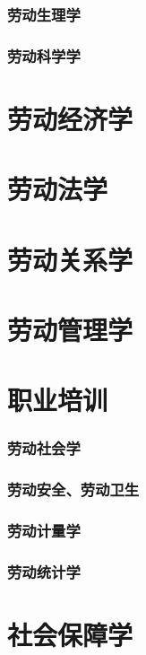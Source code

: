 \documentclass[UTF8]{../RepresentationUniverse}
\begin{document}
    \subsubsection{劳动生理学}
    \subsubsection{劳动科学学}
\section{劳动经济学}
\section{劳动法学}
\section{劳动关系学}
\section{劳动管理学}
\section{职业培训}
    \subsubsection{劳动社会学}
    \subsubsection{劳动安全、劳动卫生}
    \subsubsection{劳动计量学}
    \subsubsection{劳动统计学}
\section{社会保障学}
\end{document}
